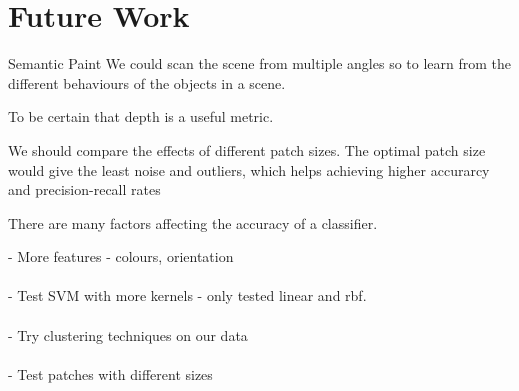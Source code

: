\chapter{Future Work} \label{chap:future}

Semantic Paint \cite{semantic-paint} We could scan the scene from multiple angles so to learn from the different behaviours of the objects in a scene.

To be certain that depth is a useful metric.

We should compare the effects of different patch sizes. The optimal patch size would give the least noise and outliers, which helps achieving higher accurarcy and precision-recall rates  

There are many factors affecting the accuracy of a classifier.

- More features - colours, orientation \\\\
- Test SVM with more kernels - only tested linear and rbf. \\\\
- Try clustering techniques on our data \\\\
- Test patches with different sizes 
